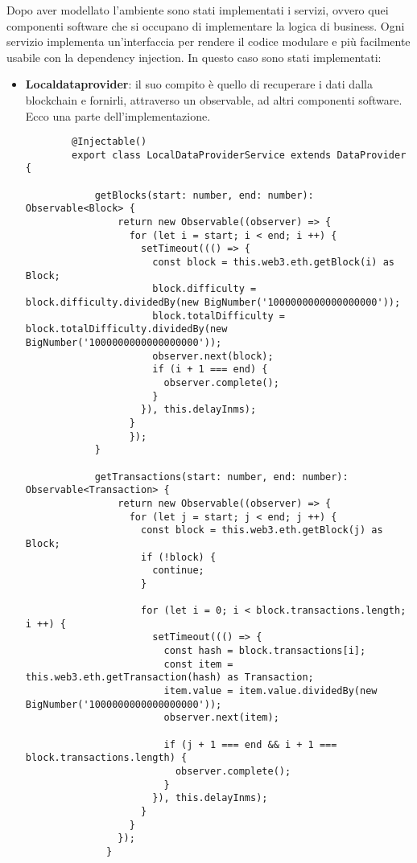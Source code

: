 Dopo aver modellato l'ambiente sono stati implementati i servizi, ovvero quei componenti software che si occupano di implementare la logica di business.
Ogni servizio implementa un'interfaccia per rendere il codice modulare e più facilmente usabile con la dependency injection.
In questo caso sono stati implementati:
\begin{itemize}
    \item {\bfseries Localdataprovider}: il suo compito è quello di recuperare i dati dalla blockchain e fornirli, attraverso un observable, ad altri componenti software.
    Ecco una parte dell'implementazione.

    \begin{lstlisting}
        @Injectable()
        export class LocalDataProviderService extends DataProvider {

            getBlocks(start: number, end: number): Observable<Block> {
                return new Observable((observer) => {
                  for (let i = start; i < end; i ++) {
                    setTimeout((() => {
                      const block = this.web3.eth.getBlock(i) as Block;
                      block.difficulty = block.difficulty.dividedBy(new BigNumber('1000000000000000000'));
                      block.totalDifficulty = block.totalDifficulty.dividedBy(new BigNumber('1000000000000000000'));
                      observer.next(block);
                      if (i + 1 === end) {
                        observer.complete();
                      }
                    }), this.delayInms);
                  }
                  });
            }

            getTransactions(start: number, end: number): Observable<Transaction> {
                return new Observable((observer) => {
                  for (let j = start; j < end; j ++) {
                    const block = this.web3.eth.getBlock(j) as Block;
                    if (!block) {
                      continue;
                    }
            
                    for (let i = 0; i < block.transactions.length; i ++) {
                      setTimeout((() => {
                        const hash = block.transactions[i];
                        const item = this.web3.eth.getTransaction(hash) as Transaction;
                        item.value = item.value.dividedBy(new BigNumber('1000000000000000000'));
                        observer.next(item);
            
                        if (j + 1 === end && i + 1 === block.transactions.length) {
                          observer.complete();
                        }
                      }), this.delayInms);
                    }
                  }
                });
              }


\end{lstlisting}
\end{itemize}
